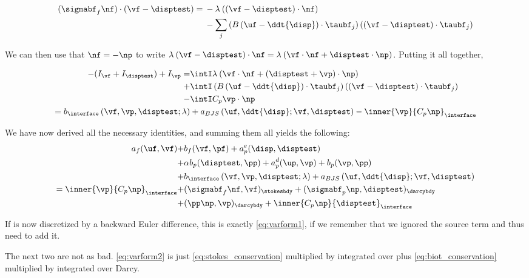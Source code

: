 \documentclass{article}
\begin{document}
\begin{align*}
(\sigmabf_f \nf) \cdot (\vf - \disptest) =  \: &-\lambda\:  ((\vf - \disptest) \cdot \nf) \\
  &- \sum_j \left (B \left ( \uf - \ddt{\disp} \right ) \cdot \taubf_j \right ) ((\vf - \disptest) \cdot \taubf_j)
\end{align*}

We can then use that $\nf = - \np$ to write $\lambda \: (\vf - \disptest) \cdot \nf = \lambda \: (\vf  \cdot \nf + \disptest \cdot \np)$.
Putting it all together,

\begin{align*}
  -(I_{\vf} + I_{\disptest}) + I_{\vp}  =& \intI \lambda\: (\vf  \cdot \nf + (\disptest + \vp) \cdot \np) \\
  + &\intI \left (B \left ( \uf - \ddt{\disp} \right ) \cdot \taubf_j \right ) ((\vf - \disptest) \cdot \taubf_j) \\
  - &\intI C_p \vp \cdot \np \\
  = b_{\interface}\left (\vf, \vp, \disptest; \lambda \right ) & + a_{BJS}\left (\uf, \ddt{\disp}; \vf, \disptest \right) - \inner{\vp}{C_p\np}_{\interface} \\
\end{align*}

We have now derived all the necessary identities, and summing them all yields the following:
\begin{align*}
  a_f(\uf, \vf) +& b_f(\vf, \pf)  + a^e_p(\disp, \disptest)  \\ +&\alpha b_p(\disptest, \pp)  + a_p^d(\up, \vp) + b_p(\vp, \pp)  \\
  + &b_{\interface}\left (\vf, \vp, \disptest; \lambda \right ) + a_{BJS}\left (\uf, \ddt{\disp}; \vf, \disptest \right)\\
  = \inner{\vp}{C_p\np}_{\interface} +& (\sigmabf_f\nf, \vf)_{\stokesbdy} + (\sigmabf_p\np, \disptest)_{\darcybdy} \\
  + &(\pp\np, \vp)_{\darcybdy} + \inner{C_p\np}{\disptest}_{\interface}\\
\end{align*}

If \ddt{\disp} is now discretized by a backward Euler difference, this is exactly \eqref{eq:varform1}, if we remember that we ignored the source term and thus need to add it.

The next two are not as bad. \eqref{eq:varform2} is just \eqref{eq:stokes_conservation} multiplied by \wf integrated over \stokes plus \eqref{eq:biot_conservation} multiplied by \wp integrated over Darcy.
\end{document}
